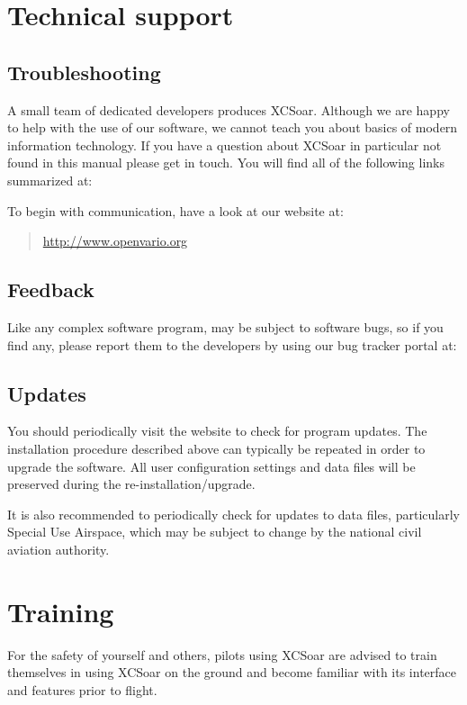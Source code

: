\section{Technical support}

\subsection*{Troubleshooting}
A small team of dedicated developers produces XCSoar. Although we are
happy to help with the use of our software, we cannot teach you about
basics of modern information technology. If you have a question about XCSoar in
particular not found in this manual please get in touch. You will find all of the following links summarized at:
\begin{quote}
\end{quote}
To begin with communication, have a look at our website at:
\begin{quote}
\url{http://www.openvario.org}
\end{quote}

\subsection*{Feedback}
Like any complex software program, \ovfc may be subject to software
bugs, so if you find any, please report them to the \ov developers
by using our bug tracker portal at: 

\subsection*{Updates}
You should periodically visit the \ov website to check for program
updates. The installation procedure described above can typically be
repeated in order to upgrade the software.  All user configuration
settings and data files will be preserved during the
re-installation/upgrade.

It is also recommended to periodically check for updates to data
files, particularly Special Use Airspace, which may be subject to
change by the national civil aviation authority.

\section{Training}
For the safety of yourself and others, pilots using XCSoar are advised to
train themselves in using XCSoar on the ground and become familiar with its
interface and features prior to flight.

